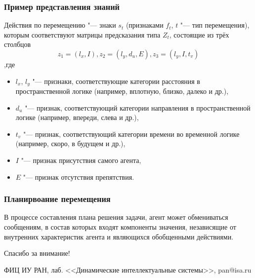 \documentclass[default]{beamer}
\begin{document}
	\begin{frame}
		\frametitle{Пример представления знаний}
		
		Действия по перемещению "--- знаки $s_t$ (признаками $f_t$, $t$ "--- тип перемещения), которым соответствуют матрицы предсказания типа $Z_t$, состоящие из трёх столбцов 
		\[
			z_1=(l_x, I), z_2=(l_y, d_u, E), z_3=(l_y, I, t_v)
		\]
		,где 
		\begin{itemize}
			\item $l_x$, $l_y$ "--- признаки, соответствующие категории расстояния в пространственной логике  (например, вплотную, близко, далеко и др.), 
			\item $d_u$ "--- признак, соответствующий категории направления в пространственной логике (например, впереди, слева и др.), 
			\item $t_v$ "--- признак, соответствующий категории времени во временной логике (например, скоро, в будущем и др.),
			\item $I$ "--- признак присутствия самого агента, 
			\item $E$ "--- признак отсутствия препятствия.
		\end{itemize}
	\end{frame}	
	
	\begin{frame}
		\frametitle{Планирвоание перемещения}
		
		В процессе составления плана решения задачи, агент может обмениваться сообщениям, в состав которых входят компоненты значения, независящие от внутренних характеристик агента и являющихся обобщенными действиями.
	\end{frame}
	
	\begin{frame}
		\centering
		\Huge
		Спасибо за внимание!
		\normalsize
		\par\bigskip
		\par\bigskip
		ФИЦ ИУ РАН, лаб. <<Динамические интеллектуальные системы>>, pan@isa.ru
	\end{frame}
									
	
\end{document}
